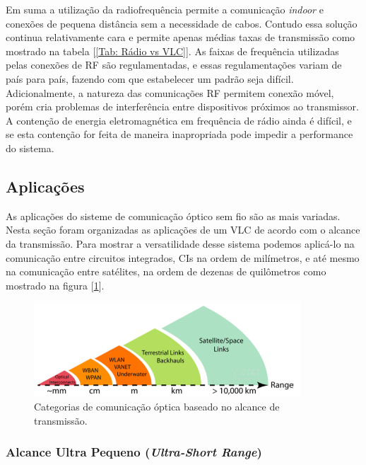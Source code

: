 Em suma a utilização da radiofrequência permite a comunicação \textit{indoor} e conexões de pequena distância sem a necessidade de cabos. Contudo essa solução continua relativamente cara e permite apenas médias taxas de transmissão como mostrado na tabela [\ref{Tab: Rádio vs VLC}].  As faixas de frequência utilizadas pelas conexões de RF são regulamentadas, e essas regulamentações variam de 
país para país, fazendo com que estabelecer um padrão seja difícil. Adicionalmente, a natureza das comunicações RF permitem conexão móvel, porém cria problemas de interferência entre dispositivos próximos ao transmissor. A contenção de energia eletromagnética em frequência de rádio ainda é difícil, e se esta contenção for feita de maneira inapropriada pode impedir a performance do sistema.

\subsection{Aplicações}

As aplicações do sisteme de comunicação óptico sem fio são as mais variadas. Nesta seção foram organizadas as aplicações de um VLC de acordo com o alcance da transmissão. Para mostrar a versatilidade desse sistema podemos aplicá-lo na comunicação entre circuitos integrados, CIs na ordem de milímetros, e até mesmo na comunicação entre satélites, na ordem de dezenas de quilômetros como mostrado na figura [\ref{Fig: faixas-de-alcance}].

\begin{figure}
	\centering
		\includegraphics[width = 10cm]{figuras/faixas-de-alcance}
	\caption{Categorias de comunicação óptica baseado no alcance de transmissão.}
	\label{Fig: faixas-de-alcance}
\end{figure}

\subsubsection{Alcance Ultra Pequeno (\textit{Ultra-Short Range})}

